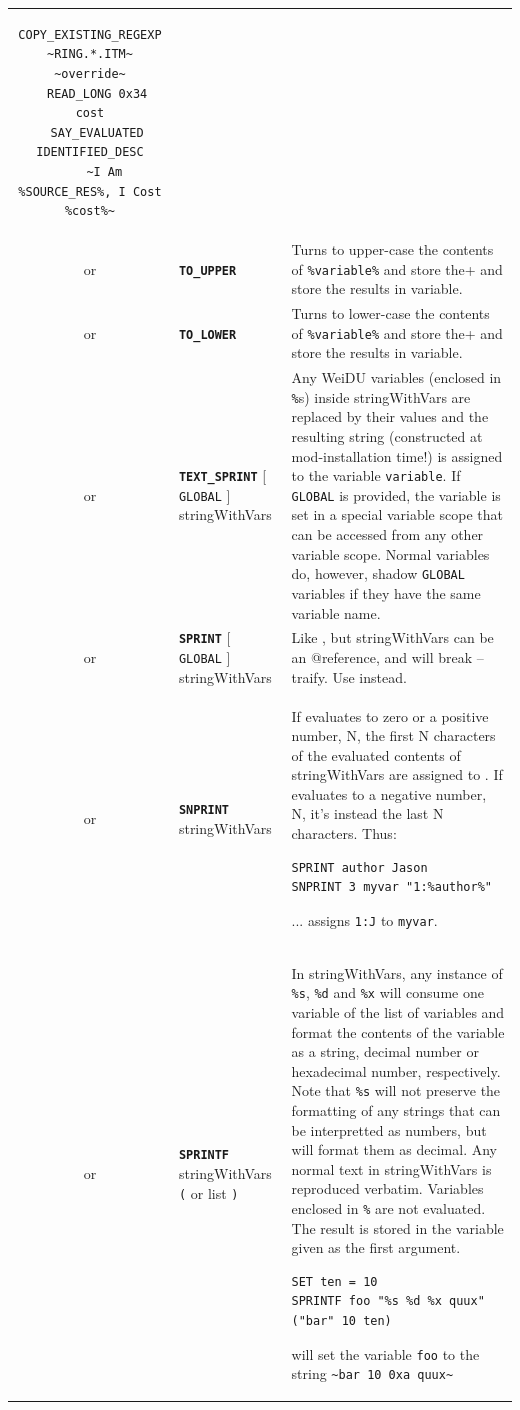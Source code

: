 \documentclass{article}
\def\ttref#1{\ahrefloc{#1}{\tt #1}}
\def\DEFINE#1{{\tt \bf #1}\label{#1}\index{#1}}
\def\t#1{{\tt #1}}
\def\Slist{{\color{red} list }}
\def\Ob{{\color{red} [ }}
\def\Oe{{\color{red} ] }}
\begin{document}
\begin{tabular}{cp{10in}|p{10in}}
\begin{verbatim}
COPY_EXISTING_REGEXP ~RING.*.ITM~ ~override~
  READ_LONG 0x34 cost
  SAY_EVALUATED IDENTIFIED_DESC
    ~I Am %SOURCE_RES%, I Cost %cost%~
\end{verbatim} \\
or & \DEFINE{TO_UPPER} \ttref{variable} &
  Turns to upper-case the contents of \verb+%variable%+ and store the
  results in variable. \\
or & \DEFINE{TO_LOWER} \ttref{variable} &
  Turns to lower-case the contents of \verb+%variable%+ and store the
  results in variable. \\
or & \DEFINE{TEXT_SPRINT} \Ob \t{GLOBAL} \Oe \ttref{variable} stringWithVars &
  Any WeiDU variables (enclosed in \t{\%}s) inside stringWithVars are
  replaced by their values and the resulting string (constructed at
  mod-installation time!) is assigned to the variable \t{variable}. If
  \t{GLOBAL} is provided, the variable is set in a special variable
  scope that can be accessed from any other variable scope. Normal
  variables do, however, shadow \t{GLOBAL} variables if they have the
  same variable name. \\
or & \DEFINE{SPRINT} \Ob \t{GLOBAL} \Oe \ttref{variable} stringWithVars &
  Like \ttref{TEXT_SPRINT}, but stringWithVars can be an @reference, and will
  break --traify. Use \ttref{TEXT_SPRINT} instead. \\

  or & \DEFINE{SNPRINT} \ttref{value} \ttref{variable} stringWithVars &
  If \ttref{value} evaluates to zero or a positive number, N, the first
  N characters of the evaluated contents of stringWithVars are
  assigned to \ttref{variable}. If \ttref{value} evaluates to a
  negative number, N, it's instead the last N characters. Thus:
\begin{verbatim}
SPRINT author Jason
SNPRINT 3 myvar "1:%author%"
\end{verbatim}
  ... assigns \t{1:J} to \t{myvar}.  \\

or & \DEFINE{SPRINTF} \ttref{variable} stringWithVars
\t{(} \ttref{variable} or \ttref{value}  \Slist \t{)} &
In stringWithVars, any instance of \t{\%s}, \t{\%d} and \t{\%x} will
consume one variable of the list of variables and format the contents
of the variable as a string, decimal number or hexadecimal number,
respectively. Note that \t{\%s} will not preserve the formatting of
any strings that can be interpretted as numbers, but will format them
as decimal. Any normal text in stringWithVars is reproduced
verbatim. Variables enclosed in \t{\%} are not evaluated. The result
is stored in the variable given as the first argument.
\begin{verbatim}
SET ten = 10
SPRINTF foo "%s %d %x quux" ("bar" 10 ten)
\end{verbatim}
will set the variable \t{foo} to the string \verb+~bar 10 0xa quux~+ \\


\end{tabular}
\end{document}
